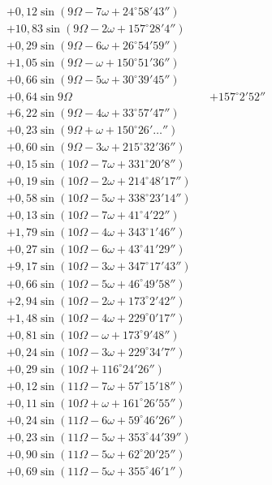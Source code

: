 \documentclass[10pt,a4paper]{article}
\begin{document}
\begin{align*}
&+ 0,12 \sin(9\Omega - 7\omega + 24^{\circ}58'43'') \\
&+ 10,83 \sin(9\Omega - 2\omega + 157^{\circ}28'4'') \\
&+ 0,29 \sin(9\Omega - 6\omega + 26^{\circ}54'59'') \\
&+ 1,05 \sin(9\Omega - \omega + 150^{\circ}51'36'') \\
&+ 0,66 \sin(9\Omega - 5\omega + 30^{\circ}39'45'') \\
&+ 0,64 \sin 9\Omega &&+ 157^{\circ}2'52'' \\
&+ 6,22 \sin(9\Omega - 4\omega + 33^{\circ}57'47'') \\
&+ 0,23 \sin(9\Omega + \omega + 150^{\circ}26'\ldots'') \\
&+ 0,60 \sin(9\Omega - 3\omega + 215^{\circ}32'36'') \\
&+ 0,15 \sin(10\Omega - 7\omega + 331^{\circ}20'8'') \\
&+ 0,19 \sin(10\Omega - 2\omega + 214^{\circ}48'17'') \\
&+ 0,58 \sin(10\Omega - 5\omega + 338^{\circ}23'14'') \\
&+ 0,13 \sin(10\Omega - 7\omega + 41^{\circ}4'22'') \\
&+ 1,79 \sin(10\Omega - 4\omega + 343^{\circ}1'46'') \\
&+ 0,27 \sin(10\Omega - 6\omega + 43^{\circ}41'29'') \\
&+ 9,17 \sin(10\Omega - 3\omega + 347^{\circ}17'43'') \\
&+ 0,66 \sin(10\Omega - 5\omega + 46^{\circ}49'58'') \\
&+ 2,94 \sin(10\Omega - 2\omega + 173^{\circ}2'42'') \\
&+ 1,48 \sin(10\Omega - 4\omega + 229^{\circ}0'17'') \\
&+ 0,81 \sin(10\Omega - \omega + 173^{\circ}9'48'') \\
&+ 0,24 \sin(10\Omega - 3\omega + 229^{\circ}34'7'') \\
&+ 0,29 \sin(10\Omega + 116^{\circ}24'26'') \\
&+ 0,12 \sin(11\Omega - 7\omega + 57^{\circ}15'18'') \\
&+ 0,11 \sin(10\Omega + \omega + 161^{\circ}26'55'') \\
&+ 0,24 \sin(11\Omega - 6\omega + 59^{\circ}46'26'') \\
&+ 0,23 \sin(11\Omega - 5\omega + 353^{\circ}44'39'') \\
&+ 0,90 \sin(11\Omega - 5\omega + 62^{\circ}20'25'') \\
&+ 0,69 \sin(11\Omega - 5\omega + 355^{\circ}46'1'') \\

\end{align*}
\end{document}
